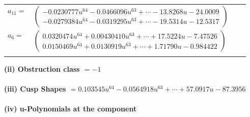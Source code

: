 \documentclass[1p]{elsarticle_modified}
\theoremstyle{definition}
\begin{document}
\begin{tabular}{m{7pt} m{180pt} m{7pt} m{180pt} }
\flushright $a_{11}=$&$\begin{pmatrix}-0.0230777 u^{64}-0.0466096 u^{63}+\cdots-13.8268 u-24.0009\\-0.0279384 u^{64}-0.0319295 u^{63}+\cdots-19.5314 u-12.5317\end{pmatrix}$ \\
\flushright $a_{6}=$&$\begin{pmatrix}0.0320474 u^{64}+0.00430410 u^{63}+\cdots+17.5224 u-7.47526\\0.0150469 u^{64}+0.0130919 u^{63}+\cdots+1.71790 u-0.984422\end{pmatrix}$\\&\end{tabular}
\flushleft \textbf{(ii) Obstruction class $= -1$}\\~\\
\flushleft \textbf{(iii) Cusp Shapes $= 0.103545 u^{64}-0.0564918 u^{63}+\cdots+57.0917 u-87.3956$}\\~\\
\newpage\renewcommand{\arraystretch}{1}
\flushleft \textbf{(iv) u-Polynomials at the component}\newline \\
\end{document}
